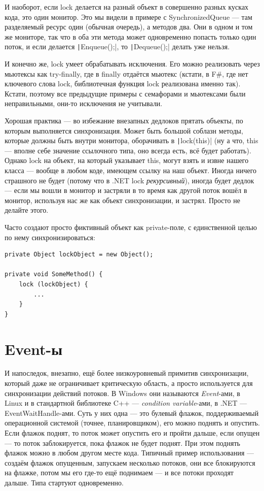 \documentclass[a5paper]{article}
\begin{document}
И наоборот, если lock делается на разный объект в совершенно разных кусках кода, это один монитор. Это мы видели в примере с SynchronizedQueue --- там разделяемый ресурс один (обычная очередь), а методов два. Они в одном и том же мониторе, так что в оба эти метода может одновременно попасть только один поток, и если делается \texttt|Enqueue();|, то \texttt|Dequeue();| делать уже нельзя.

И конечно же, lock умеет обрабатывать исключения. Его можно реализовать через мьютексы как try-finally, где в finally отдаётся мьютекс (кстати, в F\#, где нет ключевого слова lock, библиотечная функция lock реализована именно так). Кстати, поэтому все предыдущие примеры с семафорами и мьютексами были неправильными, они-то исключения не учитывали.

Хорошая практика --- во избежание внезапных дедлоков прятать объекты, по которым выполняется синхронизация. Может быть большой соблазн методы, которые должны быть внутри монитора, оборачивать в \texttt|lock(this)| (ну а что, this --- вполне себе значение ссылочного типа, оно всегда есть, всё будет работать). Однако lock на объект, на который указывает this, могут взять и извне нашего класса --- вообще в любом коде, имеющем ссылку на наш объект. Иногда ничего страшного не будет (потому что в .NET lock \textit{рекурсивный}), иногда будет дедлок --- если мы вошли в монитор и застряли в то время как другой поток вошёл в монитор, используя нас же как объект синхронизации, и застрял. Просто не делайте этого.

Часто создают просто фиктивный объект как private-поле, с единственной целью по нему синхронизироваться:
\begin{verbatim}
private Object lockObject = new Object();

private void SomeMethod() {
    lock (lockObject) {
        ...
    }
}
\end{verbatim}

\section{Event-ы}

И напоследок, внезапно, ещё более низкоуровневый примитив синхронизации, который даже не ограничивает критическую область, а просто используется для синхронизации действий потоков. В Windows они называются \textit{Event}-ами, в Linux и в стандартной библиотеке C++ --- \textit{condition variable}-ами, в .NET --- EventWaitHandle-ами. Суть у них одна --- это булевый флажок, поддерживаемый операционной системой (точнее, планировщиком), его можно поднять и опустить. Если флажок поднят, то поток может опустить его и пройти дальше, если опущен --- то поток заблокируется, пока флажок не будет поднят. При этом поднять флажок можно в любом другом месте кода. Типичный пример использования --- создаём флажок опущенным, запускаем несколько потоков, они все блокируются на флажке, потом мы его где-то ещё поднимаем --- и все потоки проходят дальше. Типа стартуют одновременно.
\end{document}
